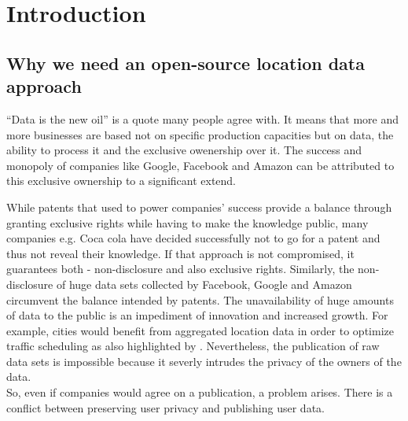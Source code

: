
\chapter{Introduction}\label{chapter:introduction}
\section{Why we need an open-source location data approach}\label{chapter:introduction:section:motivation}

“Data is the new oil” is a quote many people agree with. It means that more and more businesses are
based not on specific production capacities but on data, the ability to process it and the exclusive owenership over it. The success and monopoly of
companies like Google, Facebook and Amazon can be attributed to this exclusive ownership to a significant extend.

While patents that used to power companies' success provide a balance through granting exclusive rights while having to make the knowledge public, many companies e.g. Coca cola have decided successfully not to go for a patent and thus not reveal their knowledge. If that approach is not compromised, it guarantees both - non-disclosure and also exclusive rights. Similarly, the non-disclosure of huge data sets collected by Facebook, Google and Amazon circumvent the balance intended by patents. The unavailability of huge amounts of data to the public is an impediment of innovation and increased growth. For example, cities would benefit from aggregated location data in order to optimize traffic scheduling as also highlighted by \parencite{hoh2005protecting}.
Nevertheless, the publication of raw data sets is impossible because it severly intrudes the privacy of the owners of the data.\\

So, even if companies would agree on a publication, a problem arises.
There is a conflict between preserving user privacy and publishing user data.\\


